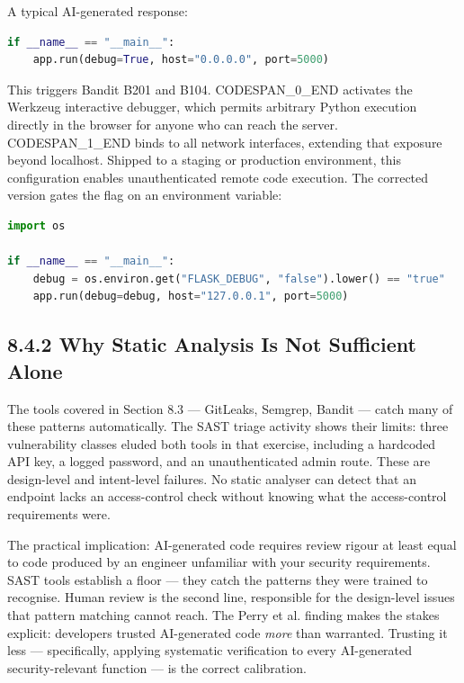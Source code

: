 \documentclass[11pt,a4paper]{book}
\begin{document}
A typical AI-generated response:

\begin{lstlisting}[language=Python]
if __name__ == "__main__":
    app.run(debug=True, host="0.0.0.0", port=5000)
\end{lstlisting}

This triggers Bandit B201 and B104. CODESPAN\_0\_END activates the Werkzeug interactive debugger, which permits arbitrary Python execution directly in the browser for anyone who can reach the server. CODESPAN\_1\_END binds to all network interfaces, extending that exposure beyond localhost. Shipped to a staging or production environment, this configuration enables unauthenticated remote code execution. The corrected version gates the flag on an environment variable:

\begin{lstlisting}[language=Python]
import os

if __name__ == "__main__":
    debug = os.environ.get("FLASK_DEBUG", "false").lower() == "true"
    app.run(debug=debug, host="127.0.0.1", port=5000)
\end{lstlisting}

\subsection{8.4.2 Why Static Analysis Is Not Sufficient Alone}

The tools covered in Section 8.3 --- GitLeaks, Semgrep, Bandit --- catch many of these patterns automatically. The SAST triage activity shows their limits: three vulnerability classes eluded both tools in that exercise, including a hardcoded API key, a logged password, and an unauthenticated admin route. These are design-level and intent-level failures. No static analyser can detect that an endpoint lacks an access-control check without knowing what the access-control requirements were.

The practical implication: AI-generated code requires review rigour at least equal to code produced by an engineer unfamiliar with your security requirements. SAST tools establish a floor --- they catch the patterns they were trained to recognise. Human review is the second line, responsible for the design-level issues that pattern matching cannot reach. The Perry et al. finding makes the stakes explicit: developers trusted AI-generated code \textit{more} than warranted. Trusting it less --- specifically, applying systematic verification to every AI-generated security-relevant function --- is the correct calibration.
\end{document}
